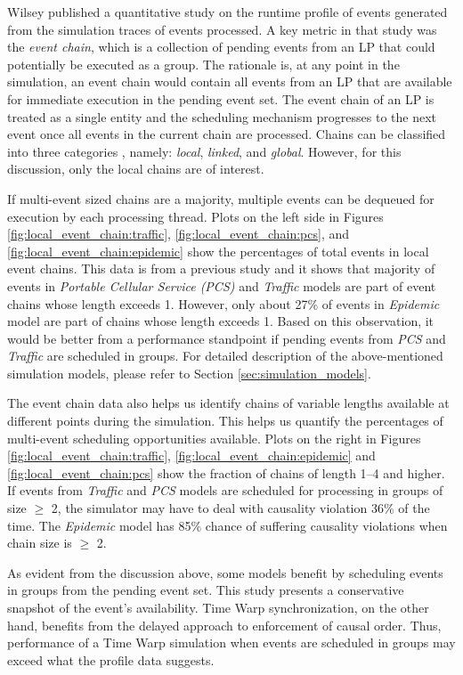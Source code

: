 \documentclass[11pt]{book}
\begin{document}
Wilsey \cite{wilsey-16} published a quantitative study on the runtime profile of events generated from the
simulation traces of events processed.  A key metric in that study was the \emph{event chain}, which is a
collection of pending events from an LP that could potentially be executed as a group.  The rationale is, at
any point in the simulation, an event chain would contain all events from an LP that are available for
immediate execution in the pending event set.  The event chain of an LP is treated as a single entity and the
scheduling mechanism progresses to the next event once all events in the current chain are processed.  Chains
can be classified into three categories \cite{wilsey-16}, namely: \emph{local}, \emph{linked}, and
\emph{global}.  However, for this discussion, only the local chains are of interest.

If multi-event sized chains are a majority, multiple events can be dequeued for execution by each processing
thread.  Plots on the left side in Figures \ref{fig:local_event_chain:traffic},
\ref{fig:local_event_chain:pcs}, and \ref{fig:local_event_chain:epidemic} show the percentages of total events
in local event chains.  This data is from a previous study \cite{wilsey-16} and it shows that majority of
events in \emph{Portable Cellular Service (PCS)} and \emph{Traffic} models are part of event chains whose
length exceeds 1.  However, only about 27\% of events in \emph{Epidemic} model are part of chains whose length
exceeds 1.  Based on this observation, it would be better from a performance standpoint if pending events from
\emph{PCS} and \emph{Traffic} are scheduled in groups.  For detailed description of the above-mentioned
simulation models, please refer to Section \ref{sec:simulation_models}.

The event chain data also helps us identify chains of variable lengths available at different points during
the simulation.  This helps us quantify the percentages of multi-event scheduling opportunities available.
Plots on the right in Figures \ref{fig:local_event_chain:traffic}, \ref{fig:local_event_chain:epidemic} and
\ref{fig:local_event_chain:pcs} show the fraction of chains of length 1--4 and higher.  If events from
\emph{Traffic} and \emph{PCS} models are scheduled for processing in groups of size $\geq$ 2, the simulator
may have to deal with causality violation 36\% of the time.  The \emph{Epidemic} model has 85\% chance of
suffering causality violations when chain size is $\geq$ 2.

As evident from the discussion above, some models benefit by scheduling events in groups from the pending
event set.  This study presents a conservative snapshot of the event's availability.  Time Warp
synchronization, on the other hand, benefits from the delayed approach to enforcement of causal order.  Thus,
performance of a Time Warp simulation when events are scheduled in groups may exceed what the profile data
suggests.
\end{document}
